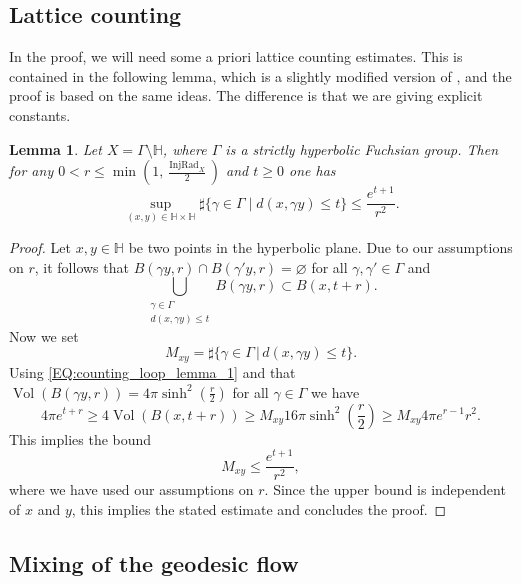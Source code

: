 \documentclass[11pt,twoside,reqno]{amsart}
\newcommand{\bH}{\mathbb{H}}
\renewcommand{\emptyset}{\varnothing}
\newcommand{\1}{\mathrm{\mathbf{1}}}
\DeclareMathOperator{\Vol}{Vol}
\DeclareMathOperator{\InjRad}{InjRad}
\numberwithin{equation}{section}
\theoremstyle{plain}
\newtheorem{lemma}[thm]{Lemma}
\theoremstyle{definition}
\theoremstyle{remark}
\begin{document}
\subsection{Lattice counting}

In the proof, we will need some a priori lattice counting estimates. This is contained in the following lemma, which is a slightly modified version of \cite[Lemma 5]{Marklof_2011}, and the proof is based on the same ideas. The difference is that we are giving explicit constants. 
\begin{lemma}\label{LE:counting_loop_lemma}
Let $X=\Gamma\setminus \bH$, where $\Gamma$ is a strictly hyperbolic Fuchsian group. Then for any
$
0<r\leq \min\!\left(1,\frac{\InjRad_X}{2}\right)$ and $t\geq 0$ one has
 \begin{equation*}
 \sup_{(x,y)\in \bH\times \bH}
 \sharp\{\gamma\in\Gamma\mid d(x,\gamma y)\leq t\}
 \leq
 \frac{e^{t+1}}{r^2}.
 \end{equation*}
\end{lemma}
%
\begin{proof}
Let $x,y\in \bH$ be two points in the hyperbolic plane. 
Due to our assumptions on $r$, it follows that $B(\gamma y,r)\cap B(\gamma' y, r) =\emptyset$ for all $\gamma,\gamma'\in\Gamma$ and 
\begin{equation}\label{EQ:counting_loop_lemma_1}
    \bigcup_{\substack{\gamma \in \Gamma \\ d(x,\gamma y)\leq t}} B(\gamma y,r) \subset B(x,t+r).
\end{equation}
Now we set
\begin{equation*}
   M_{xy} =  \sharp \big\{ \gamma \in \Gamma \, \big| \, d(x,\gamma y) \leq t \big\}.
\end{equation*}
Using \eqref{EQ:counting_loop_lemma_1} and that $\Vol(B(\gamma y,r)) = 4\pi \sinh^2(\frac{r}{2})$ for all $\gamma \in \Gamma$ we have
\begin{equation*}
   4\pi e^{t+r} \geq 4\Vol(B(x,t+r)) \geq M_{xy} 16\pi \sinh^2(\frac{r}{2}) \geq M_{xy} 4\pi e^{r-1} r^2.
\end{equation*}
This implies the bound
\begin{equation*}
    M_{xy} \leq \frac{e^{t+1}}{r^2},
\end{equation*}
where we have used our assumptions on $r$. Since the upper bound is independent of $x$ and $y$, this implies the stated estimate and concludes the proof.
\end{proof}

\subsection{Mixing of the geodesic flow} \label{sec:mixinggeo}
\end{document}
